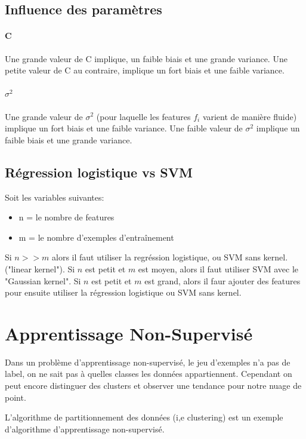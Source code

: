 \documentclass{article}
\theoremstyle{definition}
\begin{document}
\subsection{Influence des paramètres}
\paragraph{C} Une grande valeur de C implique, un faible biais et une grande variance. Une petite valeur de C au contraire, implique un fort biais et une faible variance.
\paragraph{$\sigma^2$} Une grande valeur de $\sigma^2$ (pour laquelle les features $f_i$ varient de manière fluide) implique un fort biais et une faible variance. Une faible valeur de $\sigma^2$ implique un faible biais et une grande variance.\par
\subsection{Régression logistique vs SVM}
Soit les variables suivantes:
\begin{itemize}
\item n = le nombre de features
\item m = le nombre d'exemples d'entraînement
\end{itemize}
Si $n>>m$ alors il faut utiliser la regréssion logistique, ou SVM sans kernel. ("linear kernel").\newline
Si $n$ est petit et $m$ est moyen, alors il faut utiliser SVM avec le "Gaussian kernel". \newline
Si $n$ est petit et $m$ est grand, alors il faur ajouter des features pour ensuite utiliser la régression logistique ou SVM sans kernel. \par
\newpage
\section{Apprentissage Non-Supervisé}
Dans un problème d'apprentissage non-supervisé, le jeu d'exemples n'a pas de label, on ne sait pas à quelles classes les données appartiennent. Cependant on peut encore distinguer des clusters et observer une tendance pour notre nuage de point. \par
L'algorithme de partitionnement des données (i,e clustering) est un exemple d'algorithme d'apprentissage non-supervisé.\par
\end{document}
